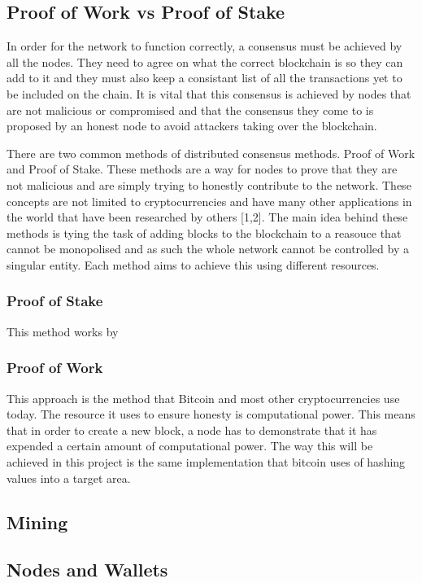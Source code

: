 \documentclass{l4proj}
\begin{document}
\subsection{Proof of Work vs Proof of Stake}
In order for the network to function correctly, a consensus must be achieved by all the nodes. They need to agree
on what the correct blockchain is so they can add to it and they must also keep a consistant list of all the 
transactions yet to be included on the chain. It is vital that this consensus is achieved by nodes that are not
malicious or compromised and that the consensus they come to is proposed by an honest node to avoid attackers
taking over the blockchain. 

There are two common methods of distributed consensus methods. Proof of Work and Proof of Stake. These methods
are a way for nodes to prove that they are not malicious and are simply trying to honestly contribute to the
network. These concepts are not limited to cryptocurrencies and have many other applications in the world that 
have been researched by others [1,2]. The main idea behind these methods is tying the task of adding blocks to the 
blockchain to a reasouce that cannot be monopolised and as such the whole network cannot be controlled by a 
singular entity. Each method aims to achieve this using different resources.

\subsubsection{Proof of Stake}
This method works by 

\subsubsection{Proof of Work}
This approach is the method that Bitcoin and most other cryptocurrencies use today. The resource it uses to 
ensure honesty is computational power. This means that in order to create a new block, a node has to demonstrate
that it has expended a certain amount of computational power. The way this will be achieved in this project is
the same implementation that bitcoin uses of hashing values into a target area.

\subsection{Mining}


\subsection{Nodes and Wallets}
\end{document}
